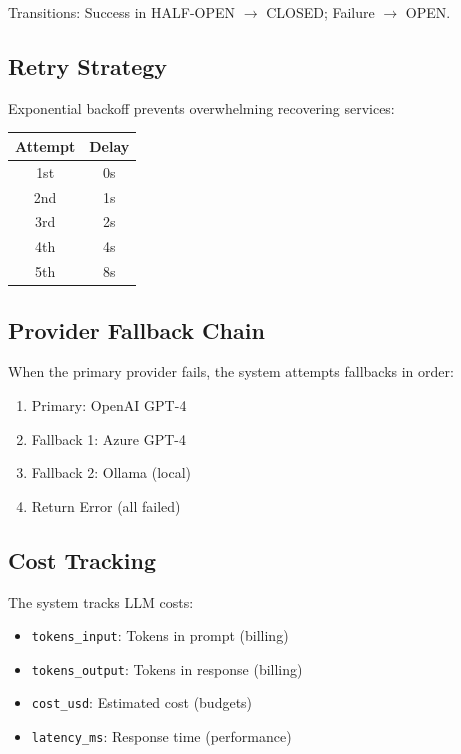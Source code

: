 \documentclass[a4paper,twoside]{sapthesis}
\begin{document}
Transitions: Success in HALF-OPEN $\rightarrow$ CLOSED; Failure $\rightarrow$ OPEN.

\subsection{Retry Strategy}
\label{subsec:retry-strategy}

Exponential backoff prevents overwhelming recovering services:

\begin{center}
\begin{tabular}{cc}
\toprule
Attempt & Delay \\
\midrule
1st & 0s \\
2nd & 1s \\
3rd & 2s \\
4th & 4s \\
5th & 8s \\
\bottomrule
\end{tabular}
\end{center}

\subsection{Provider Fallback Chain}
\label{subsec:fallback-chain}

When the primary provider fails, the system attempts fallbacks in order:

\begin{enumerate}
    \item Primary: OpenAI GPT-4
    \item Fallback 1: Azure GPT-4
    \item Fallback 2: Ollama (local)
    \item Return Error (all failed)
\end{enumerate}

\subsection{Cost Tracking}
\label{subsec:cost-tracking}

The system tracks LLM costs:

\begin{itemize}
    \item \texttt{tokens\_input}: Tokens in prompt (billing)
    \item \texttt{tokens\_output}: Tokens in response (billing)
    \item \texttt{cost\_usd}: Estimated cost (budgets)
    \item \texttt{latency\_ms}: Response time (performance)
\end{itemize}
\end{document}
